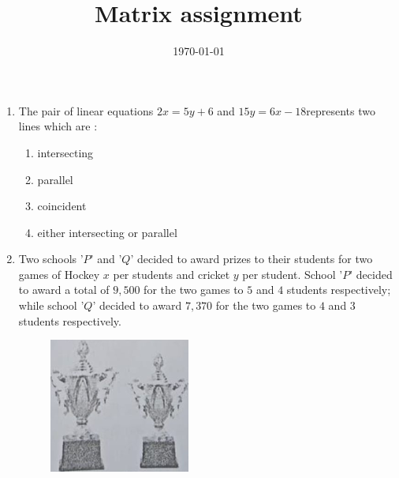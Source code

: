 \documentclass[12pt,-letter paper]{article}
\title{Matrix assignment}
\date{\today}
\begin{document}
\begin{enumerate}
	\item The pair of linear equations $ 2x=5y+6 $ and $ 15y=6x-18 $represents two lines which are : 
\begin{enumerate}
    \item intersecting
    \item parallel
    \item coincident
    \item either intersecting or parallel
\end{enumerate}
\item Two schools '$P$' and '$Q$' decided to award prizes to their students for two games of Hockey \rupee $x$ per students and cricket \rupee $y$ per student. School '$P$'
decided to award a total of \rupee $9,500$ for the two games to $5$ and $4$ students respectively; while school '$Q$' decided to award \rupee $7,370$ for the two games to $4$ and $3$ students respectively.
\begin{figure}[h]
    \centering
    \includegraphics[width=\columnwidth]{math.png}
    \label{prizes}
\end{figure}



\end{enumerate}
\end{document}
